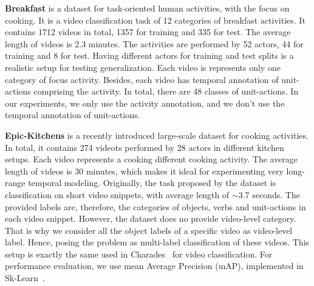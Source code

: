 \documentclass[10pt,twocolumn,letterpaper]{article}
\newcommand{\partitle}[1]{\noindent\textbf{#1}}
\newcommand{\ptspace}{\vspace*{5pt}}
\begin{document}
\ptspace
\partitle{Breakfast}
is a dataset for task-oriented human activities, with the focus on cooking.
It is a video classification task of 12 categories of breakfast activities.
It contains 1712 videos in total, 1357 for training and 335 for test.
The average length of videos is 2.3 minutes.
The activities are performed by 52 actors, 44 for training and 8 for test.
Having different actors for training and test splits is a realistic setup for testing generalization.
Each video is represents only one category of focus activity.
Besides, each video has temporal annotation of unit-actions comprising the activity.
In total, there are 48 classes of unit-actions.
In our experiments, we only use the activity annotation, and we don't use the temporal annotation of unit-actions.

\ptspace
\partitle{Epic-Kitchens}
is a recently introduced large-scale dataset for cooking activities.
In total, it contains 274 videots performed by 28 actors in different kitchen setups.
Each video represents a cooking different cooking activity.
The average length of videos is 30 minutes, which makes it ideal for experimenting very long-range temporal modeling.
Originally, the task proposed by the dataset is classification on short video snippets, with average length of $\sim$3.7 seconds.
The provided labels are, therefore, the categories of objects, verbs and unit-actions in each video snippet.
However, the dataset does no provide video-level category.
That is why we consider all the object labels of a specific video as video-level label.
Hence, posing the problem as multi-label classification of these videos.
This setup is exactly the same used in Charades~\cite{sigurdsson2016hollywood} for video classification.
For performance evaluation, we use mean Average Precision (mAP), implemented in Sk-Learn~\cite{scikit-learn}.
\end{document}
